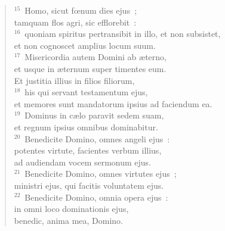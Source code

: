 \begin{flushleft}
\begin{verse}
${}^{15}$~Homo, sicut fœnum dies ejus~;\\ tamquam flos agri, sic efflorebit~:\\
${}^{16}$~quoniam spiritus pertransibit in illo, et non subsistet,\\ et non cognoscet amplius locum suum.\\
${}^{17}$~Misericordia autem Domini ab \ae terno,\\ et usque in \ae ternum super timentes eum.\\ Et justitia illius in filios filiorum,\\
${}^{18}$~his qui servant testamentum ejus,\\ et memores sunt mandatorum ipsius ad faciendum ea.\\
${}^{19}$~Dominus in c\ae lo paravit sedem suam,\\ et regnum ipsius omnibus dominabitur.\\
${}^{20}$~Benedicite Domino, omnes angeli ejus~:\\ potentes virtute, facientes verbum illius,\\ ad audiendam vocem sermonum ejus.\\
${}^{21}$~Benedicite Domino, omnes virtutes ejus~;\\ ministri ejus, qui facitis voluntatem ejus.\\
${}^{22}$~Benedicite Domino, omnia opera ejus~:\\ in omni loco dominationis ejus,\\ benedic, anima mea, Domino.\end{verse}\end{flushleft}



